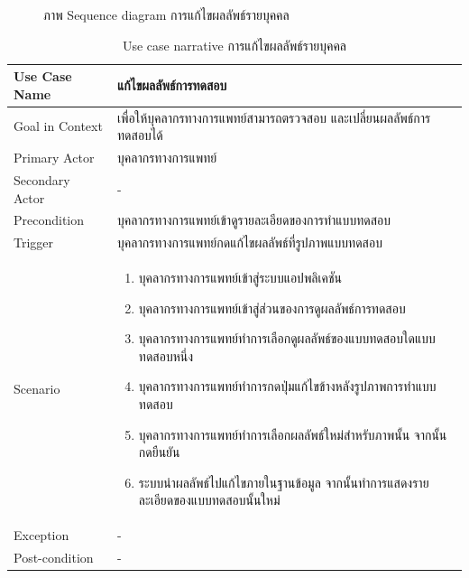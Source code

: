 \documentclass[12pt,oneside,openright,a4paper]{cpe-thai-project}
\begin{document}
\begin{itemize}
\begin{figure}[!ht]
        \caption{ภาพ Sequence diagram การแก้ไขผลลัพธ์รายบุคคล}\label{fig:activity5}
       \end{figure}
       \newpage
       \begin{table}[!h]\centering
        \caption{Use case narrative การแก้ไขผลลัพธ์รายบุคคล}\label{tbl:application1}
        \begin{tabular}{|p{4cm}|p{10cm}|} \hline
        Use Case Name & แก้ไขผลลัพธ์การทดสอบ \\ \hline
        Goal in Context & เพื่อให้บุคลากรทางการแพทย์สามารถตรวจสอบ และเปลี่ยนผลลัพธ์การทดสอบได้ \\ \hline
        Primary Actor & บุคลากรทางการแพทย์ \\ \hline
        Secondary Actor & - \\ \hline
        Precondition & บุคลากรทางการแพทย์เข้าดูรายละเอียดของการทำแบบทดสอบ \\ \hline
        Trigger & บุคลากรทางการแพทย์กดแก้ไขผลลัพธ์ที่รูปภาพแบบทดสอบ \\ \hline
        Scenario & \begin{enumerate}
          \item บุคลากรทางการแพทย์เข้าสู่ระบบแอปพลิเคชัน
          \item บุคลากรทางการแพทย์เข้าสู่ส่วนของการดูผลลัพธ์การทดสอบ
          \item บุคลากรทางการแพทย์ทำการเลือกดูผลลัพธ์ของแบบทดสอบใดแบบทดสอบหนึ่ง
          \item บุคลากรทางการแพทย์ทำการกดปุ่มแก้ไขข้างหลังรูปภาพการทำแบบทดสอบ
          \item บุคลากรทางการแพทย์ทำการเลือกผลลัพธ์ใหม่สำหรับภาพนั้น จากนั้นกดยืนยัน
          \item ระบบนำผลลัพธ์ไปแก้ไขภายในฐานข้อมูล จากนั้นทำการแสดงรายละเอียดของแบบทดสอบนั้นใหม่ 
        \end{enumerate} \\ \hline
        Exception & - \\ \hline
        Post-condition & - \\ \hline
    

\end{tabular}
\end{table}
\end{itemize}
\end{document}
